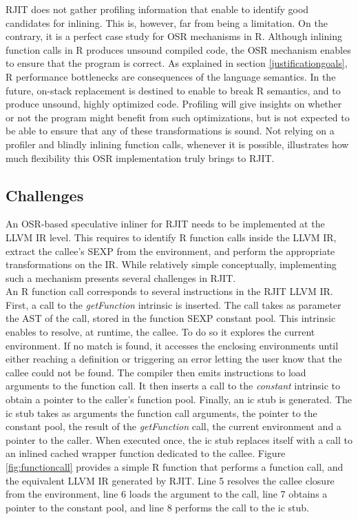 RJIT does not gather profiling information that enable to identify good candidates for inlining.
This is, however, far from being a limitation.
On the contrary, it is a perfect case study for OSR mechanisms in R.
Although inlining function calls in R produces unsound compiled code, the OSR mechanism enables to ensure that the program is correct.
As explained in section \ref{justificationgoals}, R performance bottlenecks are consequences of the language semantics.
In the future, on-stack replacement is destined to enable to break R semantics, and to produce unsound, highly optimized code.
Profiling will give insights on whether or not the program might benefit from such optimizations, but is not expected to be able to ensure that any of these transformations is sound.
Not relying on a profiler and blindly inlining function calls, whenever it is possible, illustrates how much flexibility this OSR implementation truly brings to RJIT.\\ 

\subsection{Challenges}
An OSR-based speculative inliner for RJIT needs to be implemented at the LLVM IR level.
This requires to identify R function calls inside the LLVM IR, extract the callee's SEXP from the environment, and perform the appropriate transformations on the IR.
While relatively simple conceptually, implementing such a mechanism presents several challenges in RJIT.\\

An R function call corresponds to several instructions in the RJIT LLVM IR.
First, a call to the \textit{getFunction} intrinsic is inserted.
The call takes as parameter the AST of the call, stored in the function SEXP constant pool.
This intrinsic enables to resolve, at runtime, the callee. 
To do so it explores the current environment.
If no match is found, it accesses the enclosing environments until either reaching a definition or triggering an error letting the user know that the callee could not be found.
The compiler then emits instructions to load arguments to the function call.
It then inserts a call to the \textit{constant} intrinsic to obtain a pointer to the caller's function pool.
Finally, an ic stub is generated. 
The ic stub takes as arguments the function call arguments, the pointer to the constant pool, the result of the \textit{getFunction} call, the current environment and a pointer to the caller.
When executed once, the ic stub replaces itself with a call to an inlined cached wrapper function dedicated to the callee.
Figure \ref{fig:functioncall} provides a simple R function that performs a function call, and the equivalent LLVM IR generated by RJIT.
Line 5 resolves the callee closure from the environment, line 6 loads the argument to the call, line 7 obtains a pointer to the constant pool, and line 8 performs the call to the ic stub.\\

